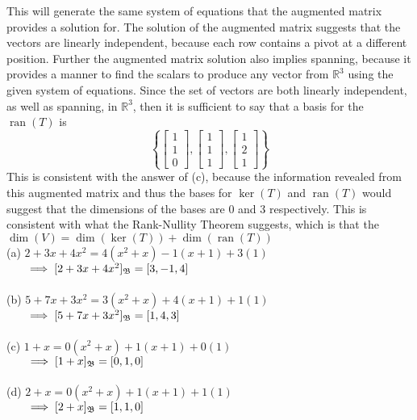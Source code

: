 \documentclass{report}
\begin{document}
This will generate the same system of equations that the augmented matrix provides a solution for.  The solution of the augmented matrix suggests that the vectors are linearly independent,  because each row contains a pivot at a different position.  Further the augmented matrix solution also implies spanning,  because it provides a manner to find the scalars to produce any vector from $\mathbb{R}^3$ using the given system of equations.  Since the set of vectors are both linearly independent,  as well as spanning, in $\mathbb{R}^3$,  then it is sufficient to say that a basis for the $\operatorname{ran}(T)$ is
$$
\left\{
\begin{bmatrix} 1 \\ 1 \\ 0 \end{bmatrix},  \begin{bmatrix} 1 \\ 1 \\ 1 \end{bmatrix}, \begin{bmatrix} 1 \\ 2 \\ 1 \end{bmatrix}\right\}
$$
This is consistent with the answer of (c),  because the information revealed from this augmented matrix and thus the bases for $\operatorname{ker}(T)$ and $\operatorname{ran}(T)$ would suggest that the dimensions of the bases are 0 and 3 respectively.  This is consistent with what the Rank-Nullity Theorem suggests,  which is that the $\operatorname{dim}(V) = \operatorname{dim}(\operatorname{ker}(T)) + \operatorname{dim}(\operatorname{ran}(T))$ 
\sol \\
(a) $2+3x+4x^2 = 4(x^2+x) - 1(x+1) + 3(1)$ \\
$\indent\implies [2+3x+4x^2]_{\mathfrak{B}} = [3,  -1,  4]$ \\
\\
(b) $5 + 7x + 3x^2 = 3(x^2+x) + 4(x+1) + 1(1)$ \\
$\indent\implies [5+7x+3x^2]_{\mathfrak{B}} = [1,  4,  3]$ \\
\\
(c) $1 + x = 0(x^2+x) + 1(x+1) + 0(1)$ \\
$\indent\implies [1+x]_{\mathfrak{B}} = [0,  1,  0]$ \\
\\
(d) $2 + x = 0(x^2+x) + 1(x+1) + 1(1)$ \\
$\indent\implies [2+x]_{\mathfrak{B}} = [1,  1,  0]$
\end{document}
